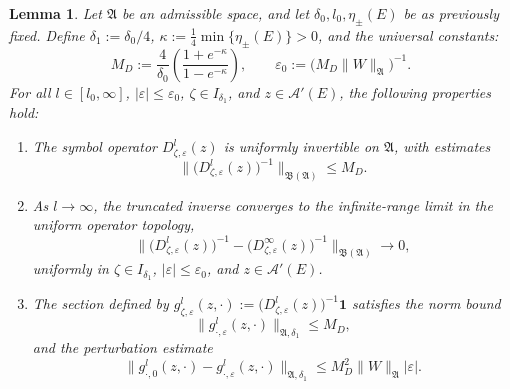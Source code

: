 \documentclass[reqno,11pt]{amsart}
\newtheorem{lemma}{Lemma}[section]
\begin{document}
\begin{lemma}\label{thm:D-abstract}
Let $\mathfrak A$ be an admissible space,  and let $\delta_0, l_0, \eta_{\pm}(E)$ be as previously fixed. Define $\delta_1 := \delta_0/4$, $\kappa := \frac{1}{4}\min\{\eta_{\pm}(E)\} > 0$, and the universal constants:
\begin{equation}\label{e0md}
M_D := \frac{4}{\delta_0} \left( \frac{1+e^{-\kappa}}{1-e^{-\kappa}} \right), \qquad \varepsilon_0 := \bigl(M_D\|W\|_\mathfrak A\bigr)^{-1}.
\end{equation}
For all $l \in [l_0, \infty]$, $|\varepsilon| \le \varepsilon_0$, $\zeta \in I_{\delta_1}$, and $z \in \mathcal{A}'(E)$, the following properties hold:

\begin{enumerate}
    \item The symbol operator $D_{\zeta,\varepsilon}^{l}(z)$ is uniformly  invertible on $\mathfrak A$, with estimates
    \begin{equation}\label{eq:uniform}
         \big\|\bigl(D_{\zeta,\varepsilon}^{l}(z)\bigr)^{-1}\bigr\|_{\mathfrak{B}(\mathfrak A)} \le M_D. 
    \end{equation}
    \item  As $l \to \infty$, the truncated inverse converges to the infinite-range limit in the uniform operator topology,
    \begin{equation}\label{equ:symcon}
    \bigl\|
    \bigl(D_{\zeta,\varepsilon}^{l}(z)\bigr)^{-1} -
    \bigl(D_{\zeta,\varepsilon}^{\infty}(z)\bigr)^{-1}
    \bigr\|_{\mathfrak{B}(\mathfrak A)}
    \to 0,
    \end{equation}
    uniformly in $\zeta \in I_{\delta_1}$, $|\varepsilon| \le \varepsilon_0$, and $z \in \mathcal{A}'(E)$.

    \item  The section defined by $g^{l}_{\zeta,\varepsilon}(z,\cdot) := \bigl(D^{l}_{\zeta,\varepsilon}(z)\bigr)^{-1}\mathbf{1}$ satisfies the norm bound
    \begin{equation}\label{eq:unig}
    \|g^{l}_{\cdot,\varepsilon}(z,\cdot)\|_{\mathfrak A,\delta_1} \le M_D,
    \end{equation}
    and the perturbation estimate
    $$
    \|g^{l}_{\cdot,0}(z,\cdot) - g^{l}_{\cdot,\varepsilon}(z,\cdot)\|_{\mathfrak A,\delta_1} \le M_D^2\|W\|_\mathfrak A |\varepsilon|.
    $$
\end{enumerate}
\end{lemma}
\end{document}
